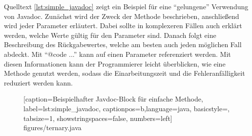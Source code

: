Quelltext \ref{lst:simple_javadoc} zeigt ein Beispiel für eine  \enquote{gelungene} Verwendung von Javadoc. Zunächst wird der Zweck der Methode beschrieben, anschließend wird jeder Parameter erläutert. Dabei sollte in komplexeren Fällen auch erklärt werden, welche Werte gültig für den Parameter sind. Danach folgt eine Beschreibung des Rückgabewertes, welche am besten auch jeden möglichen Fall abdeckt. Mit \enquote{{@code ...}} kann auf einen Parameter referenziert werden. Mit diesen Informationen kann der Programmierer leicht überblicken, wie eine Methode genutzt werden, sodass die Einarbeitungszeit und die Fehleranfälligkeit reduziert werden kann.  
		\begin{figure}
			
			[caption={Beispielhafter Javdoc-Block für einfache Methode},
			label={lst:simple_javadoc},
			captionpos=b,language=java, basicstyle=\footnotesize, tabsize=1, showstringspaces=false,  numbers=left]
			{figures/ternary.java}
		\end{figure}

